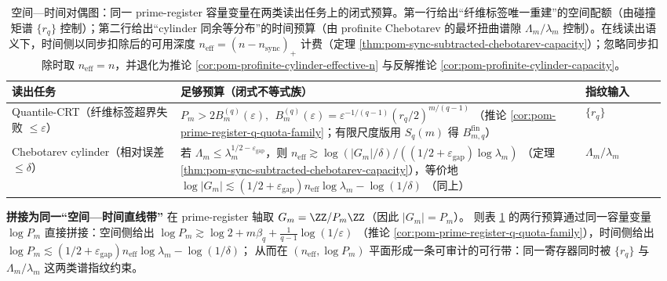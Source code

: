 \begin{table}[H]
\centering
\scriptsize
\setlength{\tabcolsep}{6pt}
\caption{空间—时间对偶图：同一 prime-register 容量变量在两类读出任务上的闭式预算。第一行给出“纤维标签唯一重建”的空间配额（由碰撞矩谱 \(\{r_q\}\) 控制）；第二行给出“cylinder 同余等分布”的时间预算（由 profinite Chebotarev 的最坏扭曲谱隙 \(\Lambda_m/\lambda_m\) 控制）。在线读出语义下，时间侧以同步扣除后的可用深度 \(n_{\mathrm{eff}}=(n-n_{\mathrm{sync}})_+\) 计费（定理 \ref{thm:pom-sync-subtracted-chebotarev-capacity}）；忽略同步扣除时取 \(n_{\mathrm{eff}}=n\)，并退化为推论 \ref{cor:pom-profinite-cylinder-effective-n} 与反解推论 \ref{cor:pom-profinite-cylinder-capacity}。}
\label{tab:pom-space-time-duality-prime-register}
\begin{tabular}{p{0.25\linewidth} p{0.60\linewidth} p{0.12\linewidth}}
\toprule
读出任务 & 足够预算（闭式不等式族） & 指纹输入\\
\midrule
Quantile-CRT（纤维标签超界失败 \(\le\varepsilon\)） &
\(
P_m>2B_m^{(q)}(\varepsilon),
\ \ 
B_m^{(q)}(\varepsilon)=\varepsilon^{-1/(q-1)}(r_q/2)^{m/(q-1)}
\)
（推论 \ref{cor:pom-prime-register-q-quota-family}；有限尺度版用 \(S_q(m)\) 得 \(B_{m,q}^{\mathrm{fin}}\)） &
\(\{r_q\}\)\\

Chebotarev cylinder（相对误差 \(\le\delta\)） &
若 \(\Lambda_m\le \lambda_m^{1/2-\varepsilon_{\mathrm{gap}}}\)，则
\(
n_{\mathrm{eff}}\gtrsim \log(|G_m|/\delta)/((1/2+\varepsilon_{\mathrm{gap}})\log\lambda_m)
\)
（定理 \ref{thm:pom-sync-subtracted-chebotarev-capacity}），等价地
\(
\log|G_m|\lesssim (1/2+\varepsilon_{\mathrm{gap}})n_{\mathrm{eff}}\log\lambda_m-\log(1/\delta)
\)
（同上） &
\(\Lambda_m/\lambda_m\)\\
\bottomrule
\end{tabular}
\end{table}

\noindent\textbf{拼接为同一“空间—时间直线带”}
在 prime-register 轴取 \(G_m=\ZZ/P_m\ZZ\)（因此 \(|G_m|=P_m\)）。
则表 \ref{tab:pom-space-time-duality-prime-register} 的两行预算通过同一容量变量 \(\log P_m\) 直接拼接：空间侧给出
\(
\log P_m\gtrsim \log 2+m\beta_q+\frac{1}{q-1}\log(1/\varepsilon)
\)
（推论 \ref{cor:pom-prime-register-q-quota-family}），时间侧给出
\(
\log P_m\lesssim (1/2+\varepsilon_{\mathrm{gap}})n_{\mathrm{eff}}\log\lambda_m-\log(1/\delta)
\)；
从而在 \((n_{\mathrm{eff}},\log P_m)\) 平面形成一条可审计的可行带：同一寄存器同时被 \(\{r_q\}\) 与 \(\Lambda_m/\lambda_m\) 这两类谱指纹约束。

